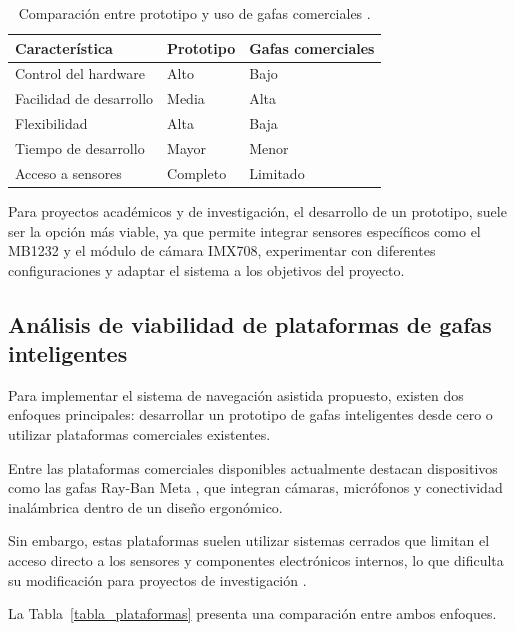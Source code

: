 \begin{table}[H]
\centering
\begin{tabular}{lll}
\hline
Característica & Prototipo & Gafas comerciales \\
\hline
Control del hardware & Alto & Bajo \\
Facilidad de desarrollo & Media & Alta \\
Flexibilidad & Alta & Baja \\
Tiempo de desarrollo & Mayor & Menor \\
Acceso a sensores & Completo & Limitado \\
\hline
\end{tabular}
\caption{Comparación entre prototipo y uso de gafas comerciales \cite{raybanmeta_official}.}
\label{tabla_lentes}
\end{table}

Para proyectos académicos y de investigación, el desarrollo de un prototipo, suele ser la opción más viable, ya que permite integrar sensores específicos como el MB1232 y el módulo de cámara IMX708, experimentar con diferentes configuraciones y adaptar el sistema a los objetivos del proyecto.

\subsection{Análisis de viabilidad de plataformas de gafas inteligentes}

Para implementar el sistema de navegación asistida propuesto, existen dos enfoques principales: desarrollar un prototipo de gafas inteligentes desde cero o utilizar plataformas comerciales existentes.

Entre las plataformas comerciales disponibles actualmente destacan dispositivos como las gafas Ray-Ban Meta \cite{raybanmeta_official}, que integran cámaras, micrófonos y conectividad inalámbrica dentro de un diseño ergonómico.

Sin embargo, estas plataformas suelen utilizar sistemas cerrados que limitan el acceso directo a los sensores y componentes electrónicos internos, lo que dificulta su modificación para proyectos de investigación \cite{raybanmeta_official}.

La Tabla~\ref{tabla_plataformas} presenta una comparación entre ambos enfoques.

